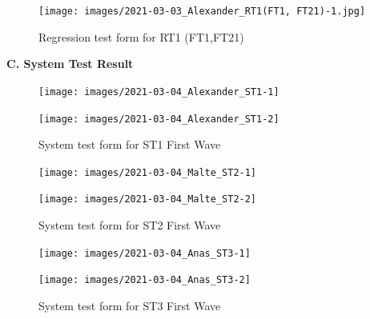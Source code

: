 \documentclass{article}
\begin{document}
  \begin{figure}
     \centering
      \texttt{[image: images/2021-03-03\_Alexander\_RT1(FT1, FT21)-1.jpg]}
     \renewcommand\figurename{Figure}
     \caption{Regression test form for RT1 (FT1,FT21)}
     \label{fig:my_label}
 \end{figure}
 

\newpage
\begin{flushleft}
{\large \textbf{C. System Test Result}}
\end{flushleft}


\begin{figure}
     \centering
     \texttt{[image: images/2021-03-04\_Alexander\_ST1-1]}
     \renewcommand\figurename{Figure}
     \label{fig:my_label}
 \end{figure}
 
 \begin{figure}
     \centering
     \texttt{[image: images/2021-03-04\_Alexander\_ST1-2]}
     \renewcommand\figurename{Figure}
     \caption{System test form for ST1 First Wave}
     \label{fig:my_label}
 \end{figure}


\begin{figure}
     \centering
     \texttt{[image: images/2021-03-04\_Malte\_ST2-1]}
     \renewcommand\figurename{Figure}
     \label{fig:my_label}
 \end{figure}
 
 \begin{figure}
     \centering
      \texttt{[image: images/2021-03-04\_Malte\_ST2-2]}
     \renewcommand\figurename{Figure}
     \caption{System test form for ST2 First Wave}
     \label{fig:my_label}
 \end{figure}
 

\begin{figure}
     \centering
    \texttt{[image: images/2021-03-04\_Anas\_ST3-1]}
     \renewcommand\figurename{Figure}
     \label{fig:my_label}
 \end{figure}
 
 \begin{figure}
     \centering
     \texttt{[image: images/2021-03-04\_Anas\_ST3-2]}
     \renewcommand\figurename{Figure}
     \caption{System test form for ST3 First Wave}
     \label{fig:my_label}
 \end{figure}
 
\end{document}
